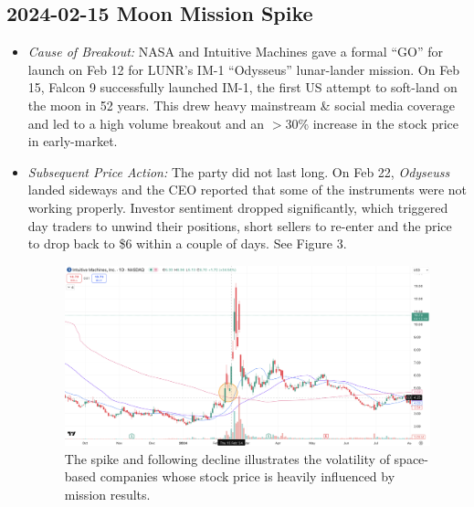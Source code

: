 \documentclass[11pt]{article}
\begin{document}
    \subsection{2024-02-15 Moon Mission Spike}
        \begin{itemize}
            \item \textit{Cause of Breakout:} NASA and Intuitive Machines gave a formal ``GO'' for launch on Feb 12 for LUNR's IM-1 ``Odysseus'' lunar-lander mission. On Feb 15, Falcon 9 successfully launched IM-1, the first US attempt to soft-land on the moon in 52 years. This drew heavy mainstream \& social media coverage and led to a high volume breakout and an $>$30\% increase in the stock price in early-market.
            \item \textit{Subsequent Price Action:} The party did not last long. On Feb 22, \textit{Odyseuss} landed sideways and the CEO reported that some of the instruments were not working properly. Investor sentiment dropped significantly, which triggered day traders to unwind their positions, short sellers to re-enter and the price to drop back to \$6 within a couple of days. See Figure 3.
            \begin{figure}[h]
                \centering \includegraphics[width=0.8\linewidth]{images/LUNR1.png}
                \caption{The spike and following decline illustrates the volatility of space-based companies whose stock price is heavily influenced by mission results.}
            \end{figure}
        \end{itemize}
\end{document}
